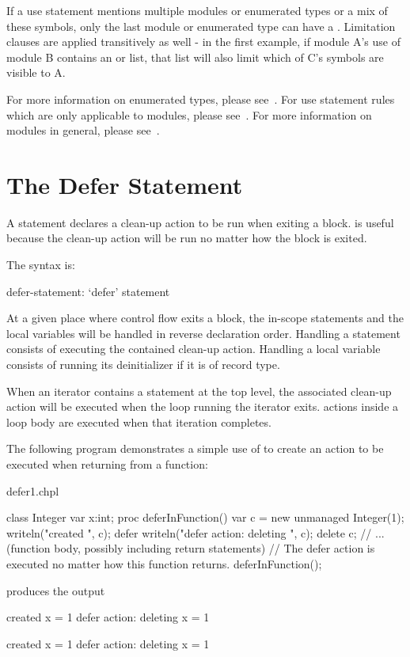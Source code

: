 If a use statement mentions multiple modules or enumerated types or a mix of
these symbols, only the last module or enumerated type can have a
.  Limitation clauses are applied transitively as well
- in the first example, if module A's use of module B contains an 
or  list, that list will also limit which of C's symbols are visible
to A.

For more information on enumerated types, please see~.
For use statement rules which are only applicable to modules, please
see~.  For more information on modules in general, please
see~.


\section{The Defer Statement}
\label{The_Defer_Statement}

A  statement declares a clean-up action to be run when
exiting a block.
 is useful because the clean-up action will be run no
matter how the block is exited.

The syntax is:

\begin{syntax}
defer-statement:
  `defer' statement
\end{syntax}

At a given place where control flow exits a block, the in-scope
 statements and the local variables will be handled in
reverse declaration order. Handling a  statement consists of
executing the contained clean-up action. Handling a local variable
consists of running its deinitializer if it is of record type.

When an iterator contains a  statement at the top level, the
associated clean-up action will be executed when the loop running the
iterator exits.  actions inside a loop body are executed
when that iteration completes.

The following program demonstrates a simple use of 
to create an action to be executed when returning from a function:

\begin{chapelexample}{defer1.chpl}
\begin{chapel}
class Integer {
  var x:int;
}
proc deferInFunction() {
  var c = new unmanaged Integer(1);
  writeln("created ", c);
  defer {
    writeln("defer action: deleting ", c);
    delete c;
  }
  // ... (function body, possibly including return statements)
  // The defer action is executed no matter how this function returns.
}
deferInFunction();
\end{chapel}
produces the output
\begin{chapeloutput}
created {x = 1}
defer action: deleting {x = 1}
\end{chapeloutput}
\begin{commandline}
created {x = 1}
defer action: deleting {x = 1}
\end{commandline}
\end{chapelexample}


